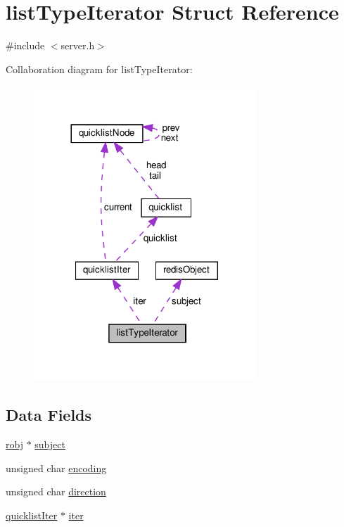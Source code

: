 \hypertarget{structlist_type_iterator}{}\section{list\+Type\+Iterator Struct Reference}
\label{structlist_type_iterator}


{\ttfamily \#include $<$server.\+h$>$}



Collaboration diagram for list\+Type\+Iterator\+:
\nopagebreak
\begin{figure}[H]
\begin{center}
\leavevmode
\includegraphics[width=236pt]{structlist_type_iterator__coll__graph}
\end{center}
\end{figure}
\subsection*{Data Fields}
\begin{DoxyCompactItemize}
\item 
\hyperlink{server_8h_a540f174d2685422fbd7d12e3cd44c8e2}{robj} $\ast$ \hyperlink{structlist_type_iterator_a8bd087874443f3e41cf5f728d8490693}{subject}
\item 
unsigned char \hyperlink{structlist_type_iterator_aebb5bc6c2404c4a5dd3ab3a29b65422f}{encoding}
\item 
unsigned char \hyperlink{structlist_type_iterator_a4c9b82152ef06a9d3b78f60779cd4b85}{direction}
\item 
\hyperlink{structquicklist_iter}{quicklist\+Iter} $\ast$ \hyperlink{structlist_type_iterator_ab8299304cd39d574da7e97bf50b13149}{iter}
\end{DoxyCompactItemize}


